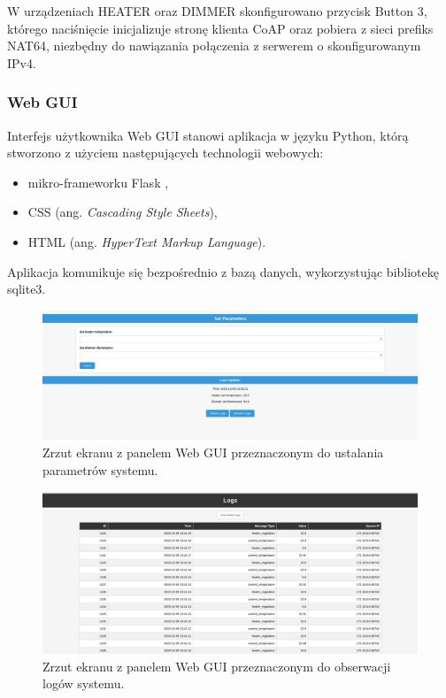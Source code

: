             W urządzeniach HEATER oraz DIMMER skonfigurowano przycisk Button 3, którego naciśnięcie inicjalizuje stronę klienta CoAP oraz pobiera z sieci prefiks NAT64, niezbędny do nawiązania połączenia z serwerem o skonfigurowanym IPv4.
        
        \subsubsection{Web GUI}

            Interfejs użytkownika Web GUI stanowi aplikacja w języku Python, którą stworzono z użyciem następujących technologii webowych:
            \begin{itemize}
                \item mikro-frameworku Flask \cite{flask},
                \item CSS (ang. \textit{Cascading Style Sheets}),
                \item HTML (ang. \textit{HyperText Markup Language}).
            \end{itemize}
            Aplikacja komunikuje się bezpośrednio z bazą danych, wykorzystując bibliotekę sqlite3.

            \begin{figure}[H]
                \centering
                \includegraphics[width=0.8\linewidth]{graphics/screenshots/web-gui-set-parameters.png}
                \caption{Zrzut ekranu z panelem Web GUI przeznaczonym do ustalania parametrów systemu.}
                \label{fig:web-gui-set-parameters}
            \end{figure}

            \begin{figure}[H]
                \centering
                \includegraphics[width=0.8\linewidth]{graphics/screenshots/web-gui-logs.png}
                \caption{Zrzut ekranu z panelem Web GUI przeznaczonym do obserwacji logów systemu.}
                \label{fig:web-gui-logs}
            \end{figure}


